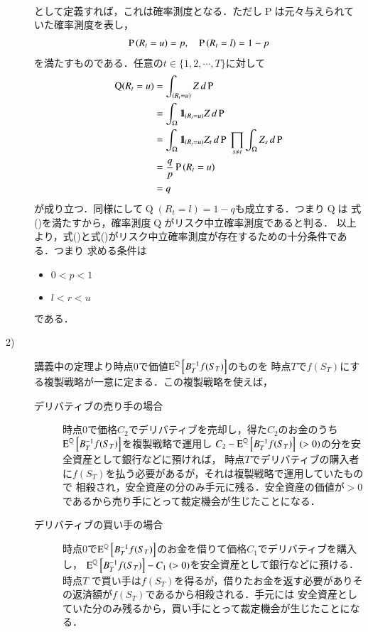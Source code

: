 \begin{description}
\begin{align}
	\end{align}
	として定義すれば，これは確率測度となる．ただし$\operatorname{P}$は元々与えられていた確率測度を表し，
	\begin{align}
		\prob{R_t = u} = p, \quad \prob{R_t = l} = 1-p
	\end{align}
	を満たすものである．任意の$t \in \{1,2,\cdots,T\}$に対して
	\begin{align}
		\operatorname{Q}(R_t = u) &= \int_{(R_t=u)} Z\, d\operatorname{P} \\
		&= \int_{\Omega} \defunc_{(R_t = u)} Z\, d\operatorname{P} \\
		&= \int_{\Omega} \defunc_{(R_t = u)} Z_t\, d\operatorname{P}\ \prod_{s \neq t} \int_{\Omega} Z_s\, d\operatorname{P} \\
		&= \frac{q}{p}\prob{R_t = u} \\
		&= q
	\end{align}
	が成り立つ．同様にして$\operatorname{Q}(R_t = l) = 1-q$も成立する．つまり$\operatorname{Q}$は
	式()を満たすから，確率測度$\operatorname{Q}$がリスク中立確率測度であると判る．
	以上より，式()と式()がリスク中立確率測度が存在するための十分条件である．つまり
	求める条件は
	\begin{itemize}
		\item $0 < p < 1$
		\item $l < r < u$
	\end{itemize}
	である．

\item[2)] 講義中の定理より時点$0$で価値$\Exp{B_T^{-1}f(S_T)}{}{\mathbb{Q}}$のものを
	時点$T$で$f(S_T)$にする複製戦略が一意に定まる．この複製戦略を使えば，
	\begin{description}
		\item[デリバティブの売り手の場合] 
			時点$0$で価格$C_2$でデリバティブを売却し，得た$C_2$のお金のうち$\Exp{B_T^{-1}f(S_T)}{}{\mathbb{Q}}$を複製戦略で運用し
			$C_2 - \Exp{B_T^{-1}f(S_T)}{}{\mathbb{Q}}\ (> 0)$の分を安全資産として銀行などに預ければ，
			時点$T$でデリバティブの購入者に$f(S_T)$を払う必要があるが，それは複製戦略で運用していたもので
			相殺され，安全資産の分のみ手元に残る．安全資産の価値が$> 0$であるから売り手にとって裁定機会が生じたことになる．
			
		\item[デリバティブの買い手の場合] 
			時点$0$で$\Exp{B_T^{-1}f(S_T)}{}{\mathbb{Q}}$のお金を借りて価格$C_1$でデリバティブを購入し，
			$\Exp{B_T^{-1}f(S_T)}{}{\mathbb{Q}} - C_1\ (>0)$を安全資産として銀行などに預ける．時点$T$
			で買い手は$f(S_T)$を得るが，借りたお金を返す必要がありその返済額が$f(S_T)$であるから相殺される．手元には
			安全資産としていた分のみ残るから，買い手にとって裁定機会が生じたことになる．
	\end{description}
\end{description}

